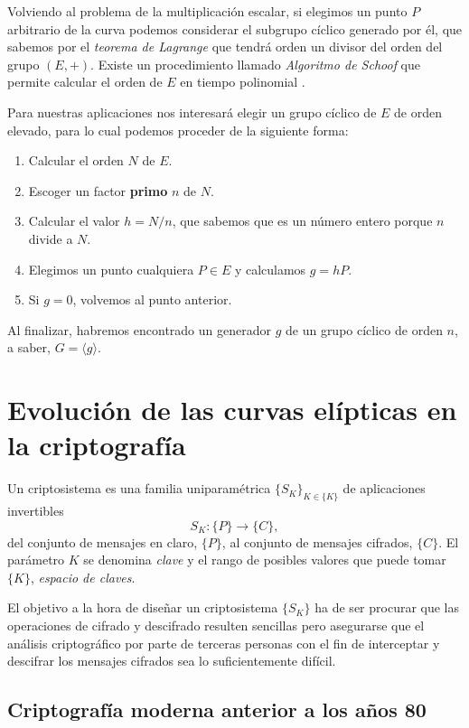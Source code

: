\documentclass[
  a4paper,
  12pt,
  spanish,
]{scrartcl}
\begin{document}
Volviendo al problema de la multiplicación escalar, si elegimos un punto $P$ arbitrario de la curva podemos considerar el subgrupo cíclico generado por él, que sabemos por el \textit{teorema de Lagrange} que tendrá orden un divisor del orden del grupo $(E, +)$. Existe un procedimiento llamado \textit{Algoritmo de Schoof} que permite calcular el orden de $E$ en tiempo polinomial \parencite{schoof_points_1995}.

Para nuestras aplicaciones nos interesará elegir un grupo cíclico de $E$ de orden elevado, para lo cual podemos proceder de la siguiente forma:

\begin{enumerate}
	\item Calcular el orden $N$ de $E$.
	\item Escoger un factor \textbf{primo} $n$ de $N$.
	\item Calcular el valor $h = N/n$, que sabemos que es un número entero porque $n$ divide a $N$.
	\item Elegimos un punto cualquiera $P \in E$ y calculamos $g = hP$.
	\item Si $g=0$, volvemos al punto anterior.
\end{enumerate}

Al finalizar, habremos encontrado un generador $g$ de un grupo cíclico de orden $n$, a saber, $G = \langle g \rangle$.

\section{Evolución de las curvas elípticas en la criptografía}

Un criptosistema es una familia uniparamétrica \(\{S_K\}_{K \in \{K\}}\) de aplicaciones invertibles \[S_K: \{P\} \to \{C\},\] del conjunto de mensajes en claro, \(\{P\}\), al conjunto de mensajes cifrados, \(\{C\}\). 
El parámetro \(K\) se denomina \textit{clave} y el rango de posibles valores que puede tomar \(\{K\}\), \textit{espacio de claves}.

El objetivo a la hora de diseñar un criptosistema \(\{S_K\}\) ha de ser procurar que las operaciones de cifrado y descifrado resulten sencillas pero asegurarse que el análisis criptográfico por parte de terceras personas con el fin de interceptar y descifrar los mensajes cifrados sea lo suficientemente difícil.

\subsection{Criptografía moderna anterior a los años 80}
\end{document}
